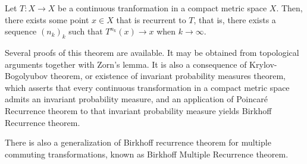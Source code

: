 \documentclass[12pt]{article}
\begin{document}
Let $T:X\rightarrow X$ be a continuous tranformation in a compact metric space $X$. Then, there exists some point $x \in X$ that is recurrent to $T$, that is, there exists a sequence $(n_k)_k$ such that $T^{n_k}(x)\rightarrow x$ when $k\rightarrow \infty$.

Several proofs of this theorem are available. It may be obtained from topological arguments together with Zorn's lemma. It is also a consequence of Krylov-Bogolyubov theorem, or existence of invariant probability measures theorem, which asserts that every continuous transformation in a compact metric space admits an invariant probability measure, and an application of Poincaré Recurrence theorem to that invariant probability measure yields Birkhoff Recurrence theorem.

There is also a generalization of Birkhoff recurrence theorem for multiple commuting transformations, known as Birkhoff Multiple Recurrence theorem.
\end{document}
